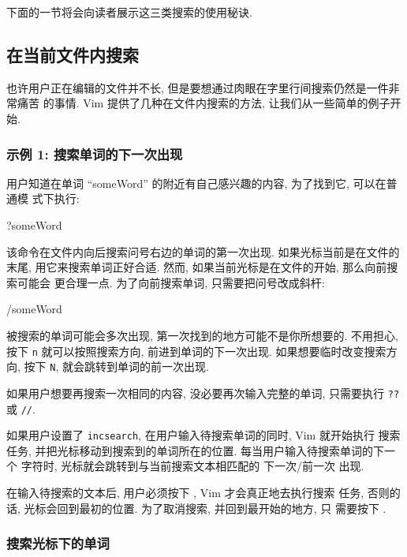 下面的一节将会向读者展示这三类搜索的使用秘诀.

\subsection{在当前文件内搜索}
\label{subsec:search_the_current_file}

也许用户正在编辑的文件并不长, 但是要想通过肉眼在字里行间搜索仍然是一件非常痛苦
的事情. Vim 提供了几种在文件内搜索的方法, 让我们从一些简单的例子开始.

\subsubsection{示例 1: 搜索单词的下一次出现}
\label{subsubsec:example_1_find_the_next_occurrence_of_a_word}

用户知道在单词 ``someWord'' 的附近有自己感兴趣的内容, 为了找到它, 可以在普通模
式下执行:
\begin{vimcode}
?someWord
\end{vimcode}
该命令在文件内向后搜索问号右边的单词的第一次出现. 如果光标当前是在文件的末尾,
用它来搜索单词正好合适. 然而, 如果当前光标是在文件的开始, 那么向前搜索可能会
更合理一点. 为了向前搜索单词, 只需要把问号改成斜杆:
\begin{vimcode}
/someWord
\end{vimcode}
被搜索的单词可能会多次出现, 第一次找到的地方可能不是你所想要的. 不用担心, 按下
\texttt{n} 就可以按照搜索方向, 前进到单词的下一次出现. 如果想要临时改变搜索方向,
按下 \texttt{N}, 就会跳转到单词的前一次出现.

如果用户想要再搜索一次相同的内容, 没必要再次输入完整的单词, 只需要执行
\texttt{??} 或 \texttt{//}.

如果用户设置了 \texttt{incsearch}, 在用户输入待搜索单词的同时, Vim 就开始执行
搜索任务, 并把光标移动到搜索到的单词所在的位置. 每当用户输入待搜索单词的下一个
字符时, 光标就会跳转到与当前搜索文本相匹配的 下一次/前一次 出现.

\begin{warning}
    在输入待搜索的文本后, 用户必须按下 , Vim 才会真正地去执行搜索
    任务, 否则的话, 光标会回到最初的位置. 为了取消搜索, 并回到最开始的地方, 只
    需要按下 .
\end{warning}

\subsubsection{搜索光标下的单词}
\label{subsubsec:search_for_a_word_under_the_cursor}

